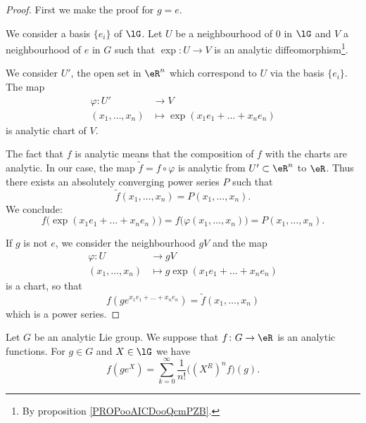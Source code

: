 \begin{proof}
    First we make the proof for \( g=e\).

    We consider a basis \( \{ e_i \}\) of \( \lG\). Let \( U\) be a neighbourhood of \( 0\) in \( \lG\) and \( V\) a neighbourhood of \( e\) in \( G\) such that \( \exp\colon U\to V\) is an analytic diffeomorphism\footnote{By proposition \ref{PROPooAICDooQcmPZB}.}.

    We consider \( U'\), the open set in \( \eR^n\) which correspond to \( U\) via the basis \( \{ e_i \}\). The map
    \begin{equation}
        \begin{aligned}
            \varphi\colon U'&\to V \\
            (x_1,\ldots, x_n)&\mapsto \exp(x_1e_1+\ldots+x_ne_n)
        \end{aligned}
    \end{equation}
    is analytic chart of \( V\).

    The fact that \( f\) is analytic means that the composition of \( f\) with the charts are analytic. In our case, the map \( \tilde f =f\circ\varphi\) is analytic from \( U'\subset \eR^n\) to \( \eR\). Thus there exists an absolutely converging power series \( P\) such that
    \begin{equation}
        \tilde f(x_1,\ldots, x_n)=P(x_1,\ldots, x_n).
    \end{equation}
    We conclude:
    \begin{equation}
        f\big( \exp(x_1e_1+\ldots +x_ne_n) \big)=f\big( \varphi(x_1,\ldots, x_n) \big)=P(x_1,\ldots, x_n).
    \end{equation}
    
    If \( g\) is not \( e\), we consider the neighbourhood \( gV\) and the map
    \begin{equation}
        \begin{aligned}
            \varphi\colon U&\to gV \\
            (x_1,\ldots, x_n)&\mapsto g\exp(x_1e_1+\ldots +x_ne_n)
        \end{aligned}
    \end{equation}
    is a chart, so that
    \begin{equation}
        f(g e^{x_1e_1+\ldots +x_ne_n})=\tilde f(x_1,\ldots, x_n)
    \end{equation}
    which is a power series.
\end{proof}

\begin{proposition}     \label{PROPooIYWQooZJtKiu}
    Let \( G\) be an analytic Lie group. We suppose that \( f\colon G\to \eR\) is an analytic functions. For \( g\in G\) and \( X\in \lG\) we have
    \begin{equation}
        f(g e^{X})=\sum_{k=0}^{\infty}\frac{1}{ n! }\big( (X^R)^nf \big)(g).
    \end{equation}
\end{proposition}

